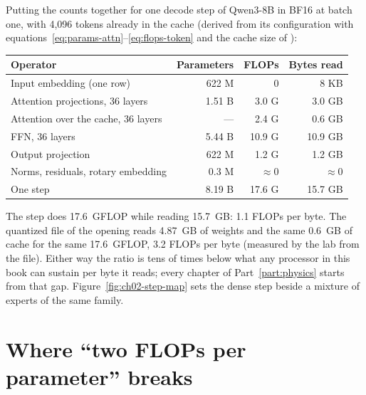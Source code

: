 Putting the counts together for one decode step of Qwen3-8B in BF16 at batch
one, with 4,096 tokens already in the cache (derived from its configuration
with equations~\eqref{eq:params-attn}--\eqref{eq:flops-token} and the cache
size of ):

\begin{center}
\begin{tabular}{@{}lrrr@{}}
\toprule
Operator & Parameters & FLOPs & Bytes read \\
\midrule
Input embedding (one row) & 622 M & 0 & 8 KB \\
Attention projections, 36 layers & 1.51 B & 3.0 G & 3.0 GB \\
Attention over the cache, 36 layers & --- & 2.4 G & 0.6 GB \\
FFN, 36 layers & 5.44 B & 10.9 G & 10.9 GB \\
Output projection & 622 M & 1.2 G & 1.2 GB \\
Norms, residuals, rotary embedding & 0.3 M & $\approx$0 & $\approx$0 \\
\midrule
One step & 8.19 B & 17.6 G & 15.7 GB \\
\bottomrule
\end{tabular}
\end{center}

The step does 17.6~GFLOP while reading 15.7~GB: 1.1 FLOPs per byte. The
quantized file of the opening reads 4.87~GB of weights and the same 0.6~GB of
cache for the same 17.6~GFLOP, 3.2 FLOPs per byte (measured by the lab from the
file). Either way the ratio is tens of times below what any processor in this
book can sustain per byte it reads; every chapter of Part~\ref{part:physics}
starts from that gap. Figure~\ref{fig:ch02-step-map} sets the dense step beside
a mixture of experts of the same family.


\section{Where ``two FLOPs per parameter'' breaks}

